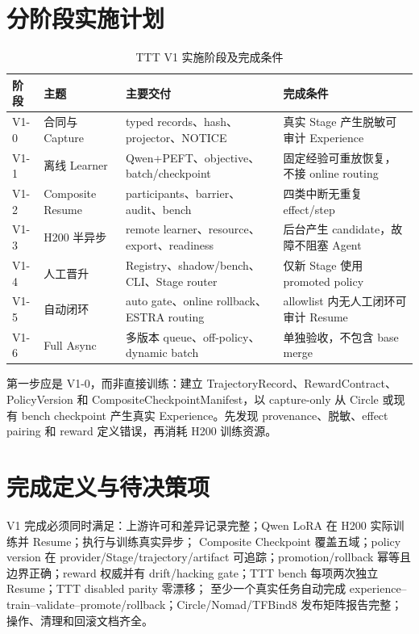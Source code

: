 \documentclass[UTF8,11pt,a4paper]{ctexart}
\begin{document}
\section{分阶段实施计划}

\begin{table}[htbp]
  \centering
  \caption{TTT V1 实施阶段及完成条件}
  \begin{tabularx}{\textwidth}{L{1.3cm}L{3.3cm}YY}
    \toprule
    阶段 & 主题 & 主要交付 & 完成条件 \\
    \midrule
    V1-0 & 合同与 Capture & typed records、hash、projector、NOTICE & 真实 Stage 产生脱敏可审计 Experience \\
    V1-1 & 离线 Learner & Qwen+PEFT、objective、batch/checkpoint & 固定经验可重放恢复，不接 online routing \\
    V1-2 & Composite Resume & participants、barrier、audit、bench & 四类中断无重复 effect/step \\
    V1-3 & H200 半异步 & remote learner、resource、export、readiness & 后台产生 candidate，故障不阻塞 Agent \\
    V1-4 & 人工晋升 & Registry、shadow/bench、CLI、Stage router & 仅新 Stage 使用 promoted policy \\
    V1-5 & 自动闭环 & auto gate、online rollback、ESTRA routing & allowlist 内无人工闭环可审计 Resume \\
    V1-6 & Full Async & 多版本 queue、off-policy、dynamic batch & 单独验收，不包含 base merge \\
    \bottomrule
  \end{tabularx}
\end{table}

第一步应是 V1-0，而非直接训练：建立 TrajectoryRecord、RewardContract、PolicyVersion 和
CompositeCheckpointManifest，以 capture-only 从 Circle 或现有 bench checkpoint 产生真实 Experience。先发现
provenance、脱敏、effect pairing 和 reward 定义错误，再消耗 H200 训练资源。

\section{完成定义与待决策项}

V1 完成必须同时满足：上游许可和差异记录完整；Qwen LoRA 在 H200 实际训练并 Resume；执行与训练真实异步；
Composite Checkpoint 覆盖五域；policy version 在 provider/Stage/trajectory/artifact 可追踪；promotion/rollback
幂等且边界正确；reward 权威并有 drift/hacking gate；TTT bench 每项两次独立 Resume；TTT disabled parity 零漂移；
至少一个真实任务自动完成 experience--train--validate--promote/rollback；Circle/Nomad/TFBind8 发布矩阵报告完整；
操作、清理和回滚文档齐全。
\end{document}
